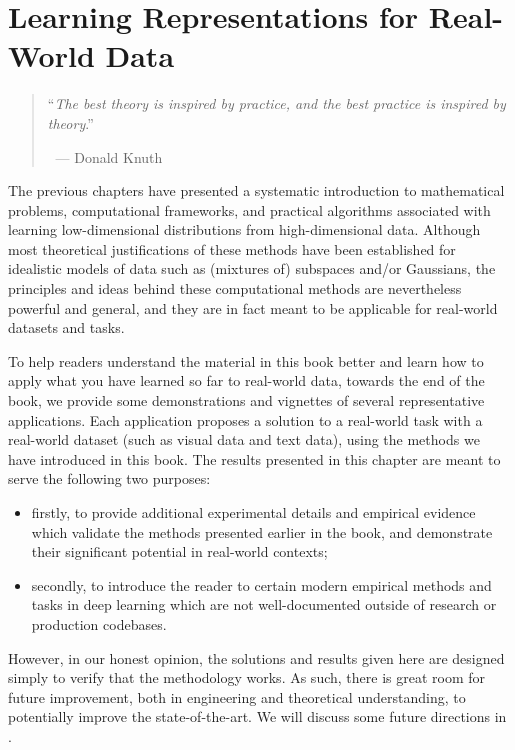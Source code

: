 \documentclass[\toplevelprefix/book-main.tex]{subfiles}
\begin{document}
\chapter{Learning Representations for Real-World Data}
\label{ch:applications}

\begin{quote}
\hfill    ``{\em The best theory is inspired by practice, and the best practice is inspired by theory}.''

$~$ \hfill --- Donald Knuth   
\end{quote}
\vspace{5mm}

The previous chapters have presented a systematic introduction to mathematical problems, computational frameworks, and practical algorithms associated with learning low-dimensional distributions from high-dimensional data. Although most theoretical justifications of these methods have been established for idealistic models of data such as (mixtures of) subspaces and/or Gaussians, the principles and ideas behind these computational methods are nevertheless powerful and general, and they are in fact meant to be applicable for real-world datasets and tasks. 

To help readers understand the material in this book better and learn how to apply what you have learned so far to real-world data, towards the end of the book, we provide some demonstrations and vignettes of several representative applications. Each application proposes a solution to a real-world task with a real-world dataset (such as visual data and text data), using the methods we have introduced in this book. The results presented in this chapter are meant to serve the following two purposes: 
\begin{itemize}
    \item firstly, to provide additional experimental details and empirical evidence which validate the methods presented earlier in the book, and demonstrate their significant potential in real-world contexts;
    \item secondly, to introduce the reader to certain modern empirical methods and tasks in deep learning which are not well-documented outside of research or production codebases.
\end{itemize}
However, in our honest opinion, the solutions and results given here are designed simply to verify that the methodology works. As such, there is great room for future improvement, both in engineering and theoretical understanding, to potentially improve the state-of-the-art. We will discuss some future directions in .  
\end{document}

